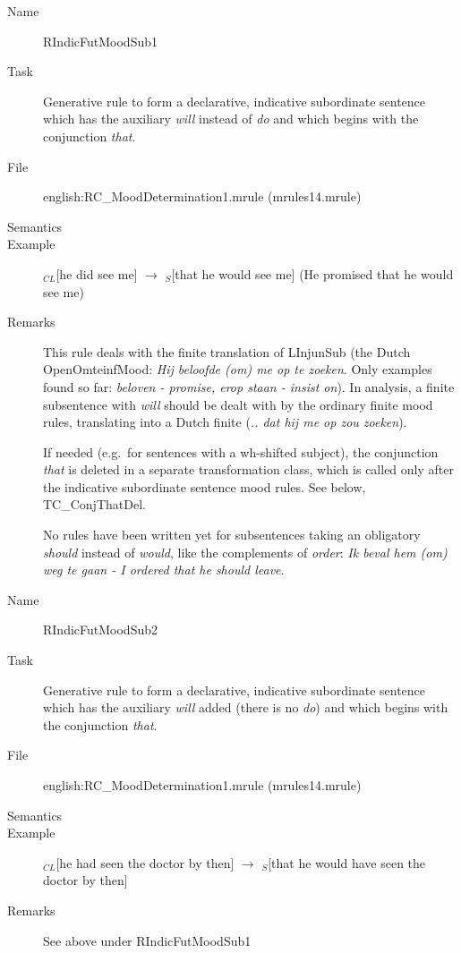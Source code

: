 \begin{description}
\vspace{1 cm}
\begin{description}
\item[Name] RIndicFutMoodSub1
\item[Task] Generative rule to form a declarative, indicative subordinate 
sentence which has 
the auxiliary {\em will\/} instead of {\em do\/} and which begins with the 
conjunction {\em that\/}. 
\item[File] english:RC\_MoodDetermination1.mrule (mrules14.mrule)
\item[Semantics]
\item[Example] $_{CL}$[he did see me] $\rightarrow$ $_S$[that he would see me]
(He promised that he would see me)
\item[Remarks] This rule deals with the finite translation of LInjunSub (the 
Dutch OpenOmteinfMood: {\em Hij beloofde (om) me op te zoeken\/}. Only examples 
found so far: {\em beloven - promise, erop staan - insist on\/}). In analysis, 
a finite subsentence with {\em will\/} should be dealt with by the ordinary 
finite mood rules, translating into a Dutch finite ({\em .. dat hij me op zou 
zoeken\/}).

If needed (e.g.\ for sentences with a wh-shifted subject), the conjunction 
{\em that\/} is deleted in a separate 
transformation class, which is called only after the indicative subordinate 
sentence mood rules. See below, TC\_ConjThatDel.

No rules have been written yet for subsentences taking an obligatory {\em 
should\/} instead of {\em would\/}, like the complements of {\em order\/}: 
{\em Ik beval hem (om) weg te gaan - I ordered that he should leave\/}.

\end{description}

\vspace{1 cm}
\begin{description}
\item[Name] RIndicFutMoodSub2
\item[Task] Generative rule to form a declarative, indicative subordinate 
sentence which has the auxiliary {\em will\/} added (there is no {\em do\/}) 
and which begins with the conjunction {\em that\/}.
\item[File] english:RC\_MoodDetermination1.mrule (mrules14.mrule)
\item[Semantics]
\item[Example] $_{CL}$[he had seen the doctor by then] $\rightarrow$ $_S$[that 
he would have seen the doctor by then]
\item[Remarks] See above under RIndicFutMoodSub1
\end{description}


\end{description}
